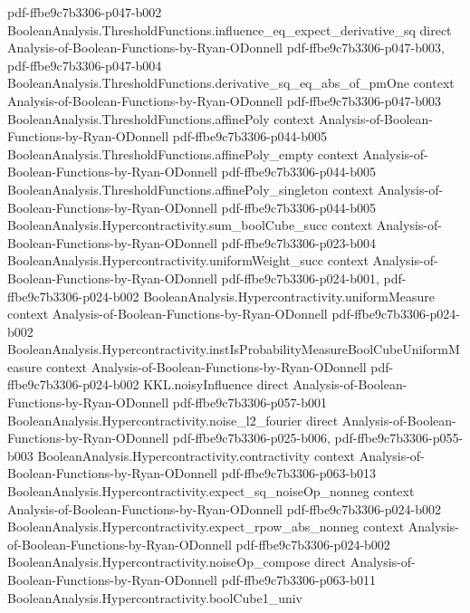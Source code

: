 \begin{lemma}
  {pdf-ffbe9c7b3306-p047-b002}
\proofstep
  {BooleanAnalysis.ThresholdFunctions.influence_eq_expect_derivative_sq}
  {direct}
  {Analysis-of-Boolean-Functions-by-Ryan-ODonnell}
  {pdf-ffbe9c7b3306-p047-b003,
    pdf-ffbe9c7b3306-p047-b004}
\proofstep
  {BooleanAnalysis.ThresholdFunctions.derivative_sq_eq_abs_of_pmOne}
  {context}
  {Analysis-of-Boolean-Functions-by-Ryan-ODonnell}
  {pdf-ffbe9c7b3306-p047-b003}
\proofstep
  {BooleanAnalysis.ThresholdFunctions.affinePoly}
  {context}
  {Analysis-of-Boolean-Functions-by-Ryan-ODonnell}
  {pdf-ffbe9c7b3306-p044-b005}
\proofstep
  {BooleanAnalysis.ThresholdFunctions.affinePoly_empty}
  {context}
  {Analysis-of-Boolean-Functions-by-Ryan-ODonnell}
  {pdf-ffbe9c7b3306-p044-b005}
\proofstep
  {BooleanAnalysis.ThresholdFunctions.affinePoly_singleton}
  {context}
  {Analysis-of-Boolean-Functions-by-Ryan-ODonnell}
  {pdf-ffbe9c7b3306-p044-b005}
\proofstep
  {BooleanAnalysis.Hypercontractivity.sum_boolCube_succ}
  {context}
  {Analysis-of-Boolean-Functions-by-Ryan-ODonnell}
  {pdf-ffbe9c7b3306-p023-b004}
\proofstep
  {BooleanAnalysis.Hypercontractivity.uniformWeight_succ}
  {context}
  {Analysis-of-Boolean-Functions-by-Ryan-ODonnell}
  {pdf-ffbe9c7b3306-p024-b001,
    pdf-ffbe9c7b3306-p024-b002}
\proofstep
  {BooleanAnalysis.Hypercontractivity.uniformMeasure}
  {context}
  {Analysis-of-Boolean-Functions-by-Ryan-ODonnell}
  {pdf-ffbe9c7b3306-p024-b002}
\proofstep
  {BooleanAnalysis.Hypercontractivity.instIsProbabilityMeasureBoolCubeUniformMeasure}
  {context}
  {Analysis-of-Boolean-Functions-by-Ryan-ODonnell}
  {pdf-ffbe9c7b3306-p024-b002}
\proofstep
  {KKL.noisyInfluence}
  {direct}
  {Analysis-of-Boolean-Functions-by-Ryan-ODonnell}
  {pdf-ffbe9c7b3306-p057-b001}
\proofstep
  {BooleanAnalysis.Hypercontractivity.noise_l2_fourier}
  {direct}
  {Analysis-of-Boolean-Functions-by-Ryan-ODonnell}
  {pdf-ffbe9c7b3306-p025-b006,
    pdf-ffbe9c7b3306-p055-b003}
\proofstep
  {BooleanAnalysis.Hypercontractivity.contractivity}
  {context}
  {Analysis-of-Boolean-Functions-by-Ryan-ODonnell}
  {pdf-ffbe9c7b3306-p063-b013}
\proofstep
  {BooleanAnalysis.Hypercontractivity.expect_sq_noiseOp_nonneg}
  {context}
  {Analysis-of-Boolean-Functions-by-Ryan-ODonnell}
  {pdf-ffbe9c7b3306-p024-b002}
\proofstep
  {BooleanAnalysis.Hypercontractivity.expect_rpow_abs_nonneg}
  {context}
  {Analysis-of-Boolean-Functions-by-Ryan-ODonnell}
  {pdf-ffbe9c7b3306-p024-b002}
\proofstep
  {BooleanAnalysis.Hypercontractivity.noiseOp_compose}
  {direct}
  {Analysis-of-Boolean-Functions-by-Ryan-ODonnell}
  {pdf-ffbe9c7b3306-p063-b011}
\proofstep
  {BooleanAnalysis.Hypercontractivity.boolCube1_univ}

\end{lemma}
